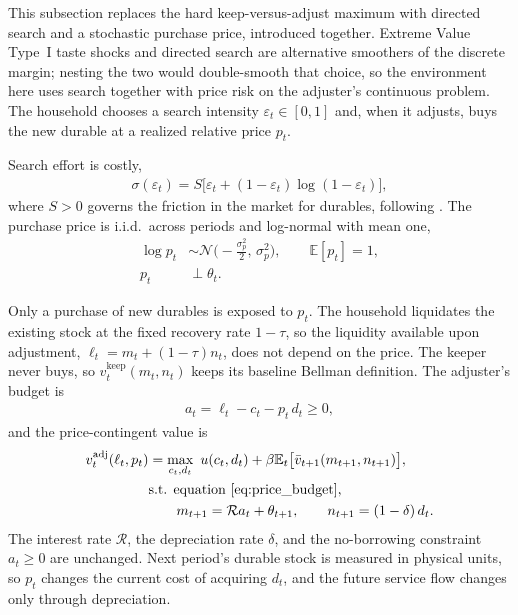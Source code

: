 This subsection replaces the hard keep-versus-adjust maximum with directed search and a stochastic purchase price, introduced together. Extreme Value Type~I taste shocks and directed search are alternative smoothers of the discrete margin; nesting the two would double-smooth that choice, so the environment here uses search together with price risk on the adjuster's continuous problem. The household chooses a search intensity $\varepsilon_t\in[0,1]$ and, when it adjusts, buys the new durable at a realized relative price $p_t$.

Search effort is costly,
\begin{align}
	\sigma(\varepsilon_t) = S\big[\varepsilon_t + (1-\varepsilon_t)\log(1-\varepsilon_t)\big], \label{eq:search_cost_basic}
\end{align}
where $S>0$ governs the friction in the market for durables, following \cite{Khan2019-ew}. The purchase price is i.i.d.\ across periods and log-normal with mean one,
\begin{align}
	\log p_t &\sim \mathcal{N}\Big(-\frac{\sigma_p^2}{2},\, \sigma_p^2\Big), \qquad \mathbb{E}[p_t] = 1, \label{eq:price_dist}\\
	p_t &\perp \theta_t. \label{eq:full_p_dist}
\end{align}

Only a purchase of new durables is exposed to $p_t$. The household liquidates the existing stock at the fixed recovery rate $1-\tau$, so the liquidity available upon adjustment, $\ell_t = m_t + (1-\tau)n_t$, does not depend on the price. The keeper never buys, so $v_t^{\text{keep}}(m_t,n_t)$ keeps its baseline Bellman definition. The adjuster's budget is
\begin{align}
	a_t = \ell_t - c_t - p_t\, d_t \ge 0, \label{eq:price_budget}
\end{align}
and the price-contingent value is
\begin{align}
	v_t^{\text{adj}}(\ell_t,p_t) &= \max_{c_t,d_t} \ u(c_t,d_t) + \beta \mathbb{E}_t \big[ \bar v_{t+1}(m_{t+1},n_{t+1}) \big],\\
	& \text{s.t. equation~\eqref{eq:price_budget},}\\
	& \qquad m_{t+1} = \mathcal{R} a_t + \theta_{t+1}, \qquad n_{t+1} = (1-\delta)\,d_t.
\end{align}
The interest rate $\mathcal{R}$, the depreciation rate $\delta$, and the no-borrowing constraint $a_t\ge 0$ are unchanged. Next period's durable stock is measured in physical units, so $p_t$ changes the current cost of acquiring $d_t$, and the future service flow changes only through depreciation.

